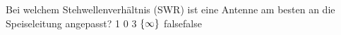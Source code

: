     {Bei welchem Stehwellenverhältnis (SWR) ist eine Antenne am besten an die Speiseleitung angepasst?}
    {1}
    {0}
    {3}
    {$\mathrm\{\infty\}$}
    {false}{false}